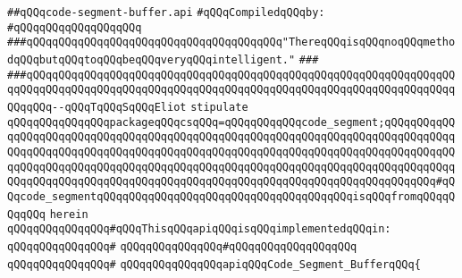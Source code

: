 \label{src/lib/compiler/execution/code-segments/code-segment-buffer.api}
\verb|##qQQqcode-segment-buffer.api|\newline
\newline
\verb|#qQQqCompiledqQQqby:|\newline
\verb|#qQQqqQQqqQQqqQQqqQQq|\newline
\newline
\newline
\newline
\verb|###qQQqqQQqqQQqqQQqqQQqqQQqqQQqqQQqqQQqqQQq"ThereqQQqisqQQqnoqQQqmethodqQQqbutqQQqtoqQQqbeqQQqveryqQQqintelligent."|\newline
\verb|###|\newline
\verb|###qQQqqQQqqQQqqQQqqQQqqQQqqQQqqQQqqQQqqQQqqQQqqQQqqQQqqQQqqQQqqQQqqQQqqQQqqQQqqQQqqQQqqQQqqQQqqQQqqQQqqQQqqQQqqQQqqQQqqQQqqQQqqQQqqQQqqQQqqQQqqQQq--qQQqTqQQqSqQQqEliot|\newline
\newline
\newline
\newline
\verb|stipulate|\newline
\verb|qQQqqQQqqQQqqQQqpackageqQQqcsqQQq=qQQqqQQqqQQqcode_segment;qQQqqQQqqQQqqQQqqQQqqQQqqQQqqQQqqQQqqQQqqQQqqQQqqQQqqQQqqQQqqQQqqQQqqQQqqQQqqQQqqQQqqQQqqQQqqQQqqQQqqQQqqQQqqQQqqQQqqQQqqQQqqQQqqQQqqQQqqQQqqQQqqQQqqQQqqQQqqQQqqQQqqQQqqQQqqQQqqQQqqQQqqQQqqQQqqQQqqQQqqQQqqQQqqQQqqQQqqQQqqQQqqQQqqQQqqQQqqQQqqQQqqQQqqQQqqQQqqQQqqQQqqQQqqQQqqQQqqQQqqQQqqQQq#qQQqcode_segmentqQQqqQQqqQQqqQQqqQQqqQQqqQQqqQQqqQQqqQQqisqQQqfromqQQqqQQqqQQq|\newline
\verb|herein|\newline
\newline
\verb|qQQqqQQqqQQqqQQq#qQQqThisqQQqapiqQQqisqQQqimplementedqQQqin:|\newline
\verb|qQQqqQQqqQQqqQQq#|\newline
\verb|qQQqqQQqqQQqqQQq#qQQqqQQqqQQqqQQqqQQq|\newline
\verb|qQQqqQQqqQQqqQQq#|\newline
\verb|qQQqqQQqqQQqqQQqapiqQQqCode_Segment_BufferqQQq{|\newline
